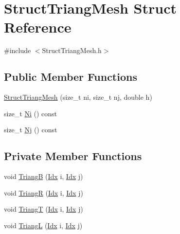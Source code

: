 \hypertarget{structStructTriangMesh}{}\section{Struct\+Triang\+Mesh Struct Reference}
\label{structStructTriangMesh}


{\ttfamily \#include $<$Struct\+Triang\+Mesh.\+h$>$}

\subsection*{Public Member Functions}
\begin{DoxyCompactItemize}
\item 
\hyperlink{structStructTriangMesh_aa36ad523618a9904d7fedd87db959d2b}{Struct\+Triang\+Mesh} (size\+\_\+t ni, size\+\_\+t nj, double h)
\item 
size\+\_\+t \hyperlink{structStructTriangMesh_abb1191f09789979668d3a8cb360d2005}{Ni} () const
\item 
size\+\_\+t \hyperlink{structStructTriangMesh_a5474a55a2ecde06204640b01c7f76438}{Nj} () const
\end{DoxyCompactItemize}
\subsection*{Private Member Functions}
\begin{DoxyCompactItemize}
\item 
void \hyperlink{structStructTriangMesh_a7e4bf4fd8c7addb9d4ca6414530409fa}{TriangB} (\hyperlink{Includes_8h_ae78891cd308078a2f5f9e7193065c805}{Idx} i, \hyperlink{Includes_8h_ae78891cd308078a2f5f9e7193065c805}{Idx} j)
\item 
void \hyperlink{structStructTriangMesh_ad7cae67790602f8b907b7da014d167b4}{TriangR} (\hyperlink{Includes_8h_ae78891cd308078a2f5f9e7193065c805}{Idx} i, \hyperlink{Includes_8h_ae78891cd308078a2f5f9e7193065c805}{Idx} j)
\item 
void \hyperlink{structStructTriangMesh_a1833d4deea986d3d13aaea07fbc95115}{TriangT} (\hyperlink{Includes_8h_ae78891cd308078a2f5f9e7193065c805}{Idx} i, \hyperlink{Includes_8h_ae78891cd308078a2f5f9e7193065c805}{Idx} j)
\item 
void \hyperlink{structStructTriangMesh_ab46b92d1b67ea75a4f9151bac1a0bb30}{TriangL} (\hyperlink{Includes_8h_ae78891cd308078a2f5f9e7193065c805}{Idx} i, \hyperlink{Includes_8h_ae78891cd308078a2f5f9e7193065c805}{Idx} j)
\end{DoxyCompactItemize}
